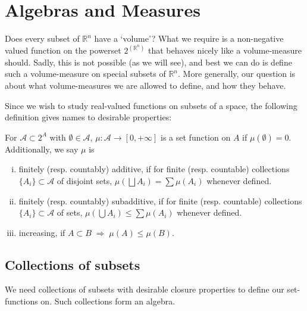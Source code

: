 \documentclass[9pt]{report}
\newtheorem[L]{theorem}{Theorem}[chapter]
\newtheorem[L,nocut]{definition}[theorem]{Definition}
\newtheorem[S,nounderline]{remark}[theorem]{Remarks}
\begin{document}
\begin{titlepage}
    \begin{center}
    \end{center}
\end{titlepage}

\chapter{Algebras and Measures}

Does every subset of \(\mathbb{R}^n\) have a `volume'? What we require is a
non-negative valued function on the powerset \(2^{(\mathbb{R}^n)}\) that
behaves nicely like a volume-measure should. Sadly, this is not possible
(as we will see), and best we can do is define such a volume-measure on
special subsets of \(\mathbb{R}^n\). More generally, our question is about
what volume-measures we are allowed to define, and how they behave.

Since we wish to study real-valued functions on subsets of a space, the following definition gives names to desirable properties:

\begin{definition} 
	For \(\mathcal{A}\subset 2^A\) with \(\emptyset \in \mathcal{A}\), 
	\(\mu: \mathcal{A}\rightarrow [0,+\infty]\) is a set function on
	\(A\) if \(\mu(\emptyset) = 0\). Additionally, we say \(\mu\) is 
	\begin{enumerate}[(i)]
		\item finitely (resp. countably) additive, if for finite
			(resp. countable) collections \(\{A_i\}\subset
			\mathcal{A}\) of disjoint sets, \(\mu(\bigsqcup
			A_i) = \sum \mu(A_i)\) whenever defined.
		\item finitely (resp. countably) subadditive, if for finite
			(resp. countable) collections \(\{A_i\}\subset
			\mathcal{A}\) of sets, \(\mu(\bigcup A_i)\leq \sum
			\mu(A_i)\) whenever defined.
		\item increasing, if \(A\subset B \; \Rightarrow \;
			\mu(A)\leq \mu(B)\). 
	\end{enumerate} 
\end{definition}

\section{Collections of subsets}

We need collections of subsets with desirable closure properties to define our set-functions on. Such collections form an algebra.
\end{document}
